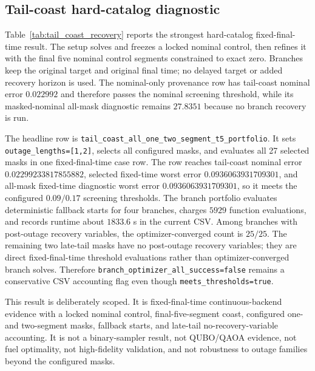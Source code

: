 \documentclass[preprint,12pt]{elsarticle}
\begin{document}
\begin{table}[t]
\centering
\caption{Cross-backend evidence synthesis generated from recorded artifacts only. Error entries are nominal / selected-worst / all-mask-worst in the normalized terminal metric. Tighter pass statuses use all-mask diagnostics conservatively; selected-branch rows remain diagnostics unless all configured masks are explicitly selected.}
\label{tab:evidence_synthesis}
\resizebox{\textwidth}{!}{}
\end{table}

\subsection{Tail-coast hard-catalog diagnostic}

Table~\ref{tab:tail_coast_recovery} reports the strongest hard-catalog fixed-final-time result. The setup solves and freezes a locked nominal control, then refines it with the final five nominal control segments constrained to exact zero. Branches keep the original target and original final time; no delayed target or added recovery horizon is used. The nominal-only provenance row has tail-coast nominal error $0.022992$ and therefore passes the nominal screening threshold, while its masked-nominal all-mask diagnostic remains $27.8351$ because no branch recovery is run.

The headline row is \texttt{tail\_coast\_all\_one\_two\_segment\_t5\_portfolio}. It sets \texttt{outage\_lengths=[1,2]}, selects all configured masks, and evaluates all 27 selected masks in one fixed-final-time case row. The row reaches tail-coast nominal error $0.02299233817855882$, selected fixed-time worst error $0.0936063931709301$, and all-mask fixed-time diagnostic worst error $0.0936063931709301$, so it meets the configured $0.09/0.17$ screening thresholds. The branch portfolio evaluates deterministic fallback starts for four branches, charges $5929$ function evaluations, and records runtime about $1833.6$ s in the current CSV. Among branches with post-outage recovery variables, the optimizer-converged count is $25/25$. The remaining two late-tail masks have no post-outage recovery variables; they are direct fixed-final-time threshold evaluations rather than optimizer-converged branch solves. Therefore \texttt{branch\_optimizer\_all\_success=false} remains a conservative CSV accounting flag even though \texttt{meets\_thresholds=true}.

This result is deliberately scoped. It is fixed-final-time continuous-backend evidence with a locked nominal control, final-five-segment coast, configured one- and two-segment masks, fallback starts, and late-tail no-recovery-variable accounting. It is not a binary-sampler result, not QUBO/QAOA evidence, not fuel optimality, not high-fidelity validation, and not robustness to outage families beyond the configured masks.
\end{document}
